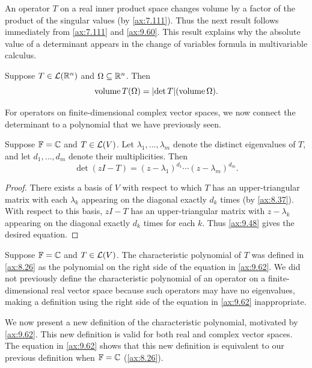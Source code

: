An operator $T$ on a real inner product space changes volume by a factor of the
product of the singular values (by \ref{ax:7.111}). Thus the next result
follows immediately from \ref{ax:7.111} and \ref{ax:9.60}. This result explains
why the absolute value of a determinant appears in the change of variables
formula in multivariable calculus.

\begin{result}\label{ax:9.61}
Suppose $T\in\mathcal{L}(\mathbb{R}^n)$ and $\Omega\subseteq\mathbb{R}^n$. Then
\[ \operatorname{volume} T(\Omega)
   = \lvert \operatorname{det} T \rvert(\operatorname{volume}\Omega). \]
\end{result}

For operators on finite-dimensional complex vector spaces, we now connect the
determinant to a polynomial that we have previously seen.

\begin{result}[If $\F=\C$, then characteristic polynomial of $T$ equals $\det(zI-T)$]\label{ax:9.62}
Suppose $\F=\C$ and $T\in\mathcal{L}(V)$. Let $\lambda_1,\dots,\lambda_m$ denote the
distinct eigenvalues of $T$, and let $d_1,\dots,d_m$ denote their
multiplicities. Then
\[ \det(zI-T) = (z-\lambda_1)^{d_1}\cdots(z-\lambda_m)^{d_m}. \]
\end{result}

\begin{proof}
There exists a basis of $V$ with respect to which $T$ has an upper-triangular
matrix with each $\lambda_k$ appearing on the diagonal exactly $d_k$ times (by
\ref{ax:8.37}). With respect to this basis, $zI-T$ has an upper-triangular
matrix with $z-\lambda_k$ appearing on the diagonal exactly $d_k$ times for
each $k$. Thus \ref{ax:9.48} gives the desired equation.
\end{proof}

Suppose $\F=\C$ and $T\in\mathcal{L}(V)$. The characteristic polynomial of $T$ was
defined in \ref{ax:8.26} as the polynomial on the right side of the equation in
\ref{ax:9.62}. We did not previously define the characteristic polynomial of an
operator on a finite-dimensional real vector space because such operators may
have no eigenvalues, making a definition using the right side of the equation
in \ref{ax:9.62} inappropriate.

We now present a new definition of the characteristic polynomial, motivated by
\ref{ax:9.62}. This new definition is valid for both real and complex vector
spaces. The equation in \ref{ax:9.62} shows that this new definition is
equivalent to our previous definition when $\F=\C$ (\ref{ax:8.26}).

